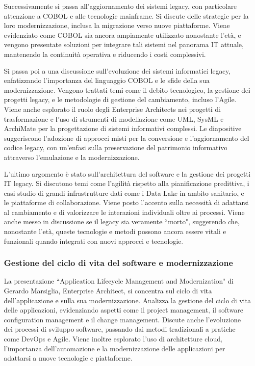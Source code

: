 \documentclass[11pt, a4paper]{article}
\theoremstyle{definition}
\begin{document}
Successivamente si passa all'aggiornamento
dei sistemi legacy, con particolare attenzione a COBOL e alle tecnologie mainframe. Si
discute delle strategie per la loro modernizzazione, inclusa la migrazione
verso nuove piattaforme. Viene evidenziato come COBOL sia ancora ampiamente utilizzato
nonostante l'età, e vengono presentate soluzioni per integrare tali sistemi nel panorama
IT attuale, mantenendo la continuità operativa e riducendo i costi complessivi.

Si passa poi
a una discussione sull'evoluzione dei sistemi informatici legacy, enfatizzando l'importanza
del linguaggio COBOL e le sfide della sua modernizzazione. Vengono trattati temi come
il debito tecnologico, la gestione dei progetti legacy, e le metodologie di gestione
del cambiamento, incluso l'Agile. Viene anche esplorato il ruolo degli Enterprise Architects
nei progetti di trasformazione e l'uso di strumenti di modellazione come UML, SysML e
ArchiMate per la progettazione di sistemi informativi complessi. Le diapositive suggeriscono
l'adozione di approcci misti per la conversione e l'aggiornamento del codice legacy, con
un'enfasi sulla preservazione del patrimonio informativo attraverso l'emulazione e la
modernizzazione.

L'ultimo argomento è stato sull'architettura del software e la gestione
dei progetti IT legacy. Si discutono temi come l'agilità rispetto alla pianificazione
predittiva, i casi studio di grandi infrastrutture dati come i Data Lake in ambito
sanitario, e le piattaforme di collaborazione. Viene posto l'accento sulla necessità di
adattarsi al cambiamento e di valorizzare le interazioni individuali oltre ai processi.
Viene anche messo in discussione se il legacy sia veramente ``morto", suggerendo che,
nonostante l'età, queste tecnologie e metodi possono ancora essere vitali e funzionali
quando integrati con nuovi approcci e tecnologie.


\subsubsection{Gestione del ciclo di vita del software e modernizzazione}
La presentazione ``Application Lifecycle Management and Modernization" di Gerardo Marsiglia,
Enterprise Architect, si concentra sul ciclo di vita dell'applicazione e sulla sua
modernizzazione. Analizza la gestione del ciclo di vita delle applicazioni,
evidenziando aspetti come il project management, il software configuration management
e il change management. Discute anche l'evoluzione dei processi di sviluppo software,
passando dai metodi tradizionali a pratiche come DevOps e Agile. Viene inoltre esplorato
l'uso di architetture cloud, l'importanza dell'automazione e la modernizzazione delle
applicazioni per adattarsi a nuove tecnologie e piattaforme.
\end{document}
